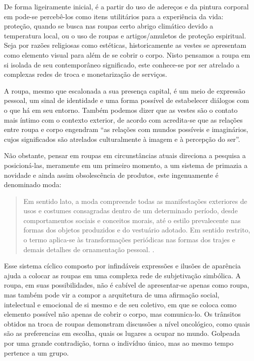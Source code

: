 \begin{refsection}
    De forma ligeiramente inicial, é a partir do uso de adereços e da pintura corporal em pode-se percebê-los como itens utilitários para a experiência da vida: proteção, quando se busca nas roupas certo abrigo climático devido a temperatura local, ou o uso de roupas e artigos/amuletos de proteção espiritual. Seja por razões religiosas como estéticas, historicamente as vestes se apresentam como elemento visual para além de se cobrir o corpo. Nisto pensamos a roupa em si isolada de seu contemporâneo significado, este conhece-se por ser atrelado a complexas redes de troca e monetarização de serviços. 

    A roupa, mesmo que escalonada a sua presença capital, é um meio de expressão pessoal, um sinal de identidade e uma forma possível de estabelecer diálogos com o que há em seu entorno. Também podemos dizer que as vestes são o contato mais íntimo com o contexto exterior, de acordo com \textcite[p.~36]{CastilhoAndMartins2005Discursos} acredita-se que as relações entre roupa e corpo engendram ``as relações com mundos possíveis e imaginários, cujos significados são atrelados culturalmente à imagem e à percepção do ser''.

    Não obstante, pensar em roupas em circunstâncias atuais direciona a pesquisa a posicioná-las, meramente em um primeiro momento, a um sistema de primazia a novidade e ainda assim obsolescência de produtos, este ingenuamente é denominado moda: 

    \begin{quotation}
        Em sentido lato, a moda compreende todas as manifestações exteriores de usos e costumes consagradas dentro de um determinado período, desde comportamentos sociais e conceitos morais, até o estilo prevalecente nas formas dos objetos produzidos e do vestuário adotado. Em sentido restrito, o termo aplica-se às transformações periódicas nas formas dos trajes e demais detalhes de ornamentação pessoal. \cite[p.~17]{Mendonca2006Reflexo}.
    \end{quotation}

    Esse sistema cíclico composto por infindáveis expressões e ilusões de aparência ajuda a colocar as roupas em uma complexa rede de subjetivação simbólica. A roupa, em suas possibilidades, não é cabível de apresentar-se apenas como roupa, mas também pode vir a compor a arquitetura de uma afirmação social, intelectual e emocional de si mesmo e de seu coletivo, em que se coloca como elemento possível não apenas de cobrir o corpo, mas comunica-lo. Os trânsitos obtidos na troca de roupas demonstram discussões a nível oncológico, como quais são as preferencias em escolha, quais os lugares a ocupar no mundo. Golpeada por uma grande contradição, torna o indivíduo único, mas ao mesmo tempo pertence a um grupo.  


\end{refsection}
